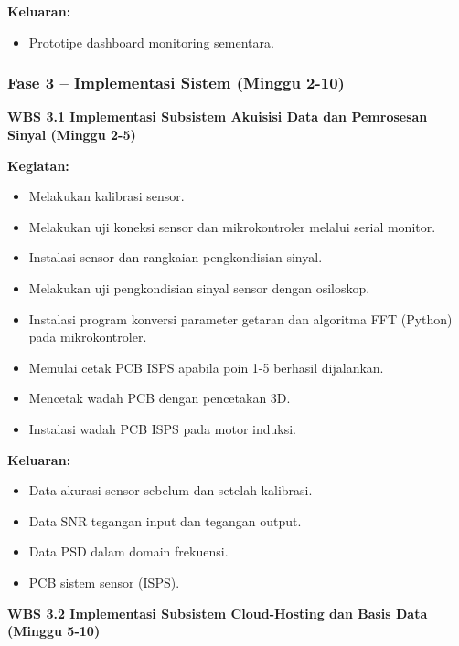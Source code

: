 \documentclass{elsinta}
\begin{document}
\textbf{Keluaran:}
\begin{itemize}
    \item Prototipe dashboard monitoring sementara.
\end{itemize}

\subsubsection*{Fase 3 -- Implementasi Sistem (Minggu 2-10)}

\textbf{WBS 3.1 Implementasi Subsistem Akuisisi Data dan Pemrosesan Sinyal  (Minggu 2-5)}

\textbf{Kegiatan:}
\begin{itemize}
    \item Melakukan kalibrasi sensor.
    \item Melakukan uji koneksi sensor dan mikrokontroler melalui serial monitor.
    \item Instalasi sensor dan rangkaian pengkondisian sinyal.
    \item Melakukan uji pengkondisian sinyal sensor dengan osiloskop.
    \item Instalasi program konversi parameter getaran dan algoritma FFT (Python) pada mikrokontroler.
    \item Memulai cetak PCB ISPS apabila poin 1-5 berhasil dijalankan.
    \item Mencetak wadah PCB dengan pencetakan 3D.
    \item Instalasi wadah PCB ISPS pada motor induksi.
\end{itemize}

\textbf{Keluaran:}
\begin{itemize}
    \item Data akurasi sensor sebelum dan setelah kalibrasi.
    \item Data SNR tegangan input dan tegangan output.
    \item Data PSD dalam domain frekuensi.
    \item PCB sistem sensor (ISPS).
\end{itemize}

\textbf{WBS 3.2 Implementasi Subsistem Cloud-Hosting dan Basis Data (Minggu 5-10)}
\end{document}
